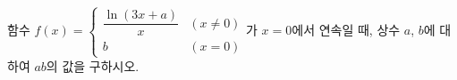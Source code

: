 함수 $f(x)=\begin{cases} \dfrac{\ln(3x+a)}{x} & (x\ne 0) \\ b & (x=0) \end{cases}$가 $x=0$에서 연속일 때, 상수 $a$, $b$에 대하여 $ab$의 값을 구하시오.
